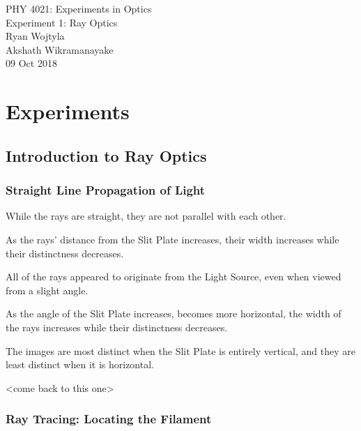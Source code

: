 \documentclass[12pt]{article}
\begin{document}

PHY 4021: Experiments in Optics \\
Experiment 1: Ray Optics \\
Ryan Wojtyla \\
Akshath Wikramanayake \\
09 Oct 2018 \\



\section{Experiments}


\subsection{Introduction to Ray Optics}

\subsubsection{Straight Line Propagation of Light}

\subsubsubsection{}

While the rays are straight, they are not parallel with each other.

\subsubsubsection{}

As the rays' distance from the Slit Plate increases, their width increases while
their distinctness decreases.

\subsubsubsection{}

All of the rays appeared to originate from the Light Source, even when viewed
from a slight angle.

\subsubsubsection{}

As the angle of the Slit Plate increases, becomes more horizontal, the width of
the rays increases while their distinctness decreases.

\subsubsubsection{}

The images are most distinct when the Slit Plate is entirely vertical, and
they are least distinct when it is horizontal.

\subsubsubsection{}

<come back to this one>

\subsubsection{Ray Tracing: Locating the Filament}
\end{document}
